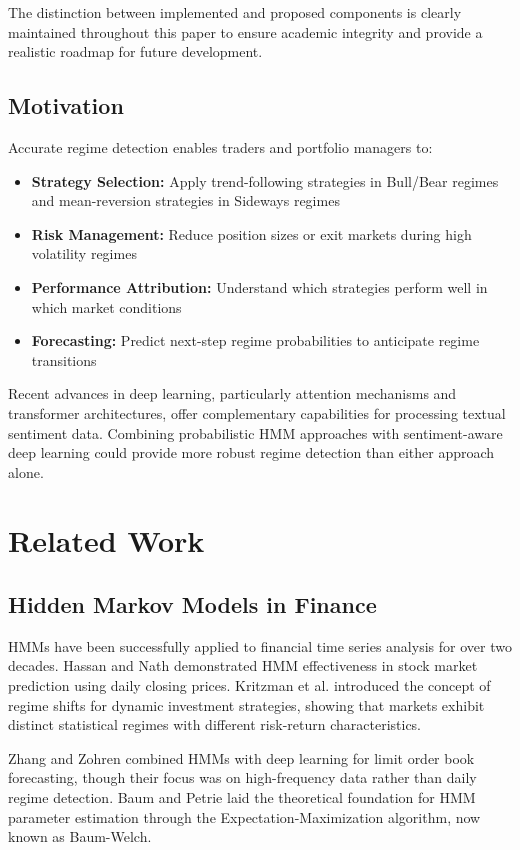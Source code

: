 \documentclass[conference]{IEEEtran}
\begin{document}
The distinction between implemented and proposed components is clearly maintained throughout this paper to ensure academic integrity and provide a realistic roadmap for future development.

\subsection{Motivation}
Accurate regime detection enables traders and portfolio managers to:
\begin{itemize}
\item \textbf{Strategy Selection:} Apply trend-following strategies in Bull/Bear regimes and mean-reversion strategies in Sideways regimes
\item \textbf{Risk Management:} Reduce position sizes or exit markets during high volatility regimes
\item \textbf{Performance Attribution:} Understand which strategies perform well in which market conditions
\item \textbf{Forecasting:} Predict next-step regime probabilities to anticipate regime transitions
\end{itemize}

Recent advances in deep learning, particularly attention mechanisms and transformer architectures, offer complementary capabilities for processing textual sentiment data. Combining probabilistic HMM approaches with sentiment-aware deep learning could provide more robust regime detection than either approach alone.

\section{Related Work}

\subsection{Hidden Markov Models in Finance}
HMMs have been successfully applied to financial time series analysis for over two decades. Hassan and Nath \cite{hassan2005} demonstrated HMM effectiveness in stock market prediction using daily closing prices. Kritzman et al. \cite{kritzman2012} introduced the concept of regime shifts for dynamic investment strategies, showing that markets exhibit distinct statistical regimes with different risk-return characteristics.

Zhang and Zohren \cite{zhang2019} combined HMMs with deep learning for limit order book forecasting, though their focus was on high-frequency data rather than daily regime detection. Baum and Petrie \cite{baum1966} laid the theoretical foundation for HMM parameter estimation through the Expectation-Maximization algorithm, now known as Baum-Welch.
\end{document}
